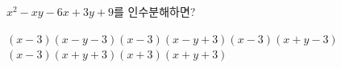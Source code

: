 $x^2-xy-6x+3y+9$를 인수분해하면?
\begin{choicesii}{$(x-3)(x-y-3)$}{$(x-3)(x-y+3)$}{$(x-3)(x+y-3)$}{$(x-3)(x+y+3)$}{$(x+3)(x+y+3)$}\end{choicesii}
